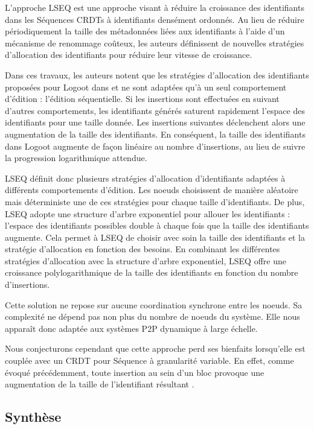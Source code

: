 L'approche LSEQ \cite{lseq2013, lseq2017} est une approche visant à réduire la croissance des identifiants dans les Séquences \acp{CRDT} à identifiants densément ordonnés.
Au lieu de réduire périodiquement la taille des métadonnées liées aux identifiants à l'aide d'un mécanisme de renommage coûteux, les auteurs définissent de nouvelles stratégies d'allocation des identifiants pour réduire leur vitesse de croissance.

Dans ces travaux, les auteurs notent que les stratégies d'allocation des identifiants proposées pour Logoot dans \cite{2009-logoot-weiss} et \cite{2010-logoot-undo-weiss} ne sont adaptées qu'à un seul comportement d'édition : l'édition séquentielle.
Si les insertions sont effectuées en suivant d'autres comportements, les identifiants générés saturent rapidement l'espace des identifiants pour une taille donnée.
Les insertions suivantes déclenchent alors une augmentation de la taille des identifiants.
En conséquent, la taille des identifiants dans Logoot augmente de façon linéaire au nombre d'insertions, au lieu de suivre la progression logarithmique attendue.

LSEQ définit donc plusieurs stratégies d'allocation d'identifiants adaptées à différents comportements d'édition.
Les noeuds choisissent de manière aléatoire mais déterministe une de ces stratégies pour chaque taille d'identifiants.
De plus, LSEQ adopte une structure d'arbre exponentiel pour allouer les identifiants : l'espace des identifiants possibles double à chaque fois que la taille des identifiants augmente.
Cela permet à LSEQ de choisir avec soin la taille des identifiants et la stratégie d'allocation en fonction des besoins.
En combinant les différentes stratégies d'allocation avec la structure d'arbre exponentiel, LSEQ offre une croissance polylogarithmique de la taille des identifiants en fonction du nombre d'insertions.

Cette solution ne repose sur aucune coordination synchrone entre les noeuds.
Sa complexité ne dépend pas non plus du nombre de noeuds du système.
Elle nous apparaît donc adaptée aux systèmes \ac{P2P} dynamique à large échelle.

Nous conjecturons cependant que cette approche perd ses bienfaits lorsqu'elle est couplée avec un \ac{CRDT} pour Séquence à granularité variable.
En effet, comme évoqué précédemment, toute insertion au sein d'un bloc provoque une augmentation de la taille de l'identifiant résultant .

\subsection{Synthèse}

